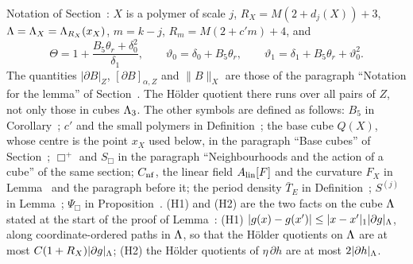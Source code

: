 Notation of Section~: $X$ is a polymer of scale $j$, $R_X=M(2+d_j(X))+3$, $\Lambda=\Lambda_X=\Lambda_{R_X}(x_X)$, $m=k-j$, $R_m=M(2+c'm)+4$, and
\[
\Theta=1+\frac{B_5\theta_r+\delta_0^2}{\delta_1},\qquad\vartheta_0=\delta_0+B_5\theta_r,\qquad\vartheta_1=\delta_1+B_5\theta_r+\vartheta_0^2 .
\]
The quantities $|\partial B|_Z$, $[\partial B]_{\alpha,Z}$ and $\|B\|_X$ are those of the paragraph ``Notation for the lemma'' of Section~. The H\"older quotient there runs over all pairs of $Z$, not only those in cubes $\Lambda_3$. The other symbols are defined as follows: $B_5$ in Corollary~; $c'$ and the small polymers in Definition~; the base cube $Q(X)$, whose centre is the point $x_X$ used below, in the paragraph ``Base cubes'' of Section~; $\Box^+$ and $S_\Box$ in the paragraph ``Neighbourhoods and the action of a cube'' of the same section; $C_{\rm nf}$, the linear field $A_{\rm lin}[F]$ and the curvature $F_X$ in Lemma~ and the paragraph before it; the period density $\bar T_E$ in Definition~; $S^{(j)}$ in Lemma~; $\Psi_\Box$ in Proposition~. (H1) and (H2) are the two facts on the cube $\Lambda$ stated at the start of the proof of Lemma~: (H1) $|g(x)-g(x')|\le|x-x'|_1|\partial g|_\Lambda$, along coordinate-ordered paths in $\Lambda$, so that the H\"older quotients on $\Lambda$ are at most $C(1+R_X)|\partial g|_\Lambda$; (H2) the H\"older quotients of $\eta\,\partial h$ are at most $2|\partial h|_\Lambda$.

